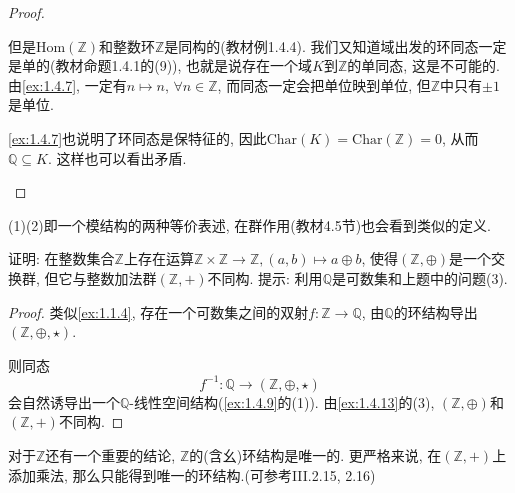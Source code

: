 \begin{proof}
\begin{enumerate}[(1)]
        但是$\mathrm{Hom}(\mathbb{Z})$和整数环$\mathbb{Z}$是同构的(教材例1.4.4). 我们又知道域出发的环同态一定是单的(教材命题1.4.1的(9)), 也就是说存在一个域$K$到$\mathbb{Z}$的单同态, 这是不可能的. 由\ref{ex:1.4.7}, 一定有$n \mapsto n,\, \forall n \in \mathbb{Z}$, 而同态一定会把单位映到单位, 但$\mathbb{Z}$中只有$\pm1$是单位.
        
        \ref{ex:1.4.7}也说明了环同态是保特征的, 因此$\mathrm{Char}(K) = \mathrm{Char}(\mathbb{Z}) = 0$, 从而$\mathbb{Q} \subseteq K$. 这样也可以看出矛盾.
    \end{enumerate}
\end{proof}

\begin{remark}
    (1)(2)即一个模结构的两种等价表述, 在群作用(教材4.5节)也会看到类似的定义.
\end{remark}

\begin{problem}
    证明: 在整数集合$\mathbb{Z}$上存在运算$\mathbb{Z} \times \mathbb{Z} \to \mathbb{Z}, (a,b) \mapsto a \oplus b$, 使得$(\mathbb{Z}, \oplus)$是一个交换群, 但它与整数加法群$(\mathbb{Z}, +)$不同构. 提示: 利用$\mathbb{Q}$是可数集和上题中的问题(3).
\end{problem}

\begin{proof}
    类似\ref{ex:1.1.4}, 存在一个可数集之间的双射$f: \mathbb{Z} \to \mathbb{Q}$, 由$\mathbb{Q}$的环结构导出$(\mathbb{Z}, \oplus, \star)$.
    
    则同态
    \[
        f^{-1}: \mathbb{Q} \to (\mathbb{Z}, \oplus, \star)
    \]
    会自然诱导出一个$\mathbb{Q}$-线性空间结构(\ref{ex:1.4.9}的(1)). 由\ref{ex:1.4.13}的(3), $(\mathbb{Z}, \oplus)$和$(\mathbb{Z}, +)$不同构.
\end{proof}

\begin{remark}
    对于$\mathbb{Z}$还有一个重要的结论, $\mathbb{Z}$的(含幺)环结构是唯一的. 更严格来说, 在$(\mathbb{Z}, +)$上添加乘法, 那么只能得到唯一的环结构.(可参考\cite{aluffi2009algebra}III.2.15, 2.16)
\end{remark}